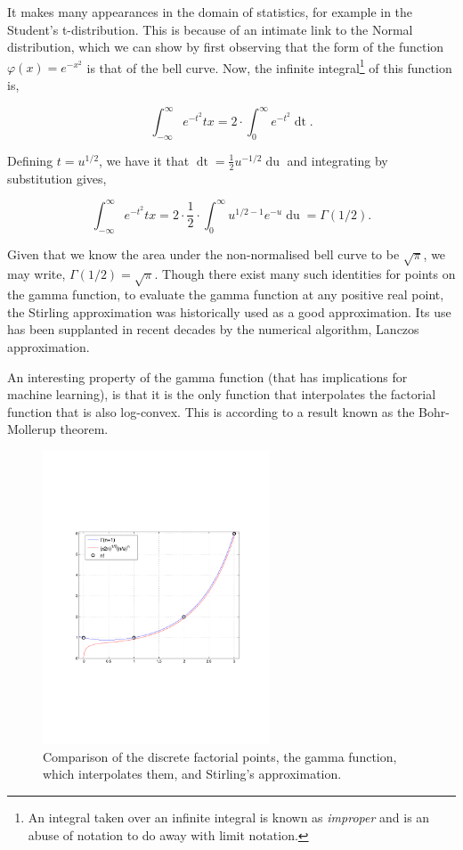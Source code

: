\documentclass[11pt]{amsart}
\begin{document}
It makes many appearances in the domain of statistics, for example in the Student's t-distribution. This is because of an intimate link to the Normal distribution, which we can show by first observing that the form of the function $\varphi(x) = e^{-x^2}$ is that of the bell curve. Now, the infinite integral\footnote{An integral taken over an infinite integral is known as \emph{improper} and is an abuse of notation to do away with limit notation.} of this function is,

$$\int_{-\infty}^{\infty} e^{-t^2} tx = 2\cdot\int_{0}^{\infty} e^{-t^2} \mathop{dt}.$$

Defining $t = u^{1/2}$, we have it that $\mathop{dt} = \frac{1}{2}u^{-1/2}\mathop{du}$ and integrating by substitution gives,

$$\int_{-\infty}^{\infty} e^{-t^2} tx = 2\cdot\frac{1}{2}\cdot\int_{0}^{\infty}u^{1/2 - 1} e^{-u}\mathop{du} = \Gamma(1/2).$$

Given that we know the area under the non-normalised bell curve to be $\sqrt{\pi}$, we may write, $\Gamma(1/2) = \sqrt{\pi}$. Though there exist many such identities for points on the gamma function, to evaluate the gamma function at any positive real point, the Stirling approximation was historically used as a good approximation. Its use has been supplanted in recent decades by the numerical algorithm, Lanczos approximation.

An interesting property of the gamma function (that has implications for machine learning), is that it is the only function that interpolates the factorial function that is also log-convex. This is according to a result known as the Bohr-Mollerup theorem.

\begin{figure}[!ht]
\centering
\includegraphics[width=0.6\textwidth]{Figures/factorial.pdf}
\caption{Comparison of the discrete factorial points, the gamma function, which interpolates them, and Stirling's approximation.\cite{factorial}}
\label{fig:factorial}
\end{figure}
\end{document}
